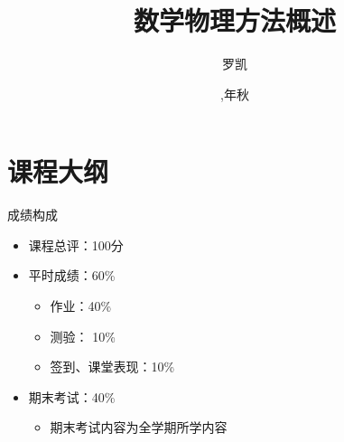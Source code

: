 \documentclass[fontset=windows, chinese, 10pt]{beamer}
\title{数学物理方法概述}
\date{\zhdigits{\the\year},\zhganzhinian{\the\year}年秋}
\author{罗凯}
\institute{南京理工大学物理学院}
\begin{document}

  

  
  
  
  \begin{frame}
  \titlepage
  \end{frame}
  
  

  \section{课程大纲}
\label{sec:outline}

\begin{frame}{成绩构成}
  \begin{itemize}
    \item 课程总评：100分
    \item 平时成绩：60\%
    \begin{itemize}
      \item 作业：40\%
      \item 测验： 10\%
      \item 签到、课堂表现：10\%
    \end{itemize}
    \item 期末考试：40\%
    \begin{itemize}
      \item 期末考试内容为全学期所学内容
    \end{itemize}
  \end{itemize}
\end{frame}
\end{document}
